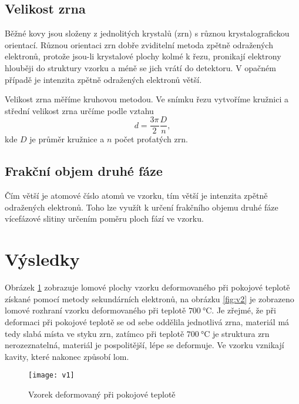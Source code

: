 \documentclass{protokol}
\begin{document}
    \subsection*{Velikost zrna}

      Běžné kovy jsou složeny z jednolitých krystalů (zrn) s různou krystalografickou orientací. Různou orientaci zrn dobře zviditelní metoda zpětně odražených elektronů, protože jsou-li krystalové plochy kolmé k řezu, pronikají elektrony hlouběji do struktury vzorku a méně se jich vrátí do detektoru. V opačném případě je intenzita zpětně odražených elektronů větší.

      Velikost zrna měříme kruhovou metodou. Ve snímku řezu vytvoříme kružnici a střední velikost zrna určíme podle vztahu
      \begin{equation} \label{eq:d}
        d = \frac{3 \pi}{2} \frac{D}{n},
      \end{equation}
      kde $D$ je průměr kružnice a $n$ počet proťatých zrn.

    \subsection*{Frakční objem druhé fáze}

      Čím větší je atomové číslo atomů ve vzorku, tím větší je intenzita zpětně odražených elektronů. Toho lze využít k určení frakčního objemu druhé fáze vícefázové slitiny určením poměru ploch fází ve vzorku.
    
  \section*{Výsledky}

    Obrázek \ref{fig:v1} zobrazuje lomové plochy vzorku deformovaného při pokojové teplotě získané pomocí metody sekundárních elektronů, na obrázku \ref{fig:v2} je zobrazeno lomové rozhraní vzorku deformovaného při teplotě $\SI{700}{\celsius}$. Je zřejmé, že při deformaci při pokojové teplotě se od sebe oddělila jednotlivá zrna, materiál má tedy slabá místa ve styku zrn, zatímco při teplotě $\SI{700}{\celsius}$ je struktura zrn nerozeznatelná, materiál je pospolitější, lépe se deformuje. Ve vzorku vznikají kavity, které nakonec způsobí lom.

    \begin{figure}[H]
      \centering 
      \texttt{[image: v1]}
      \vspace{5pt}
      \caption{Vzorek deformovaný při pokojové teplotě}
      \label{fig:v1}
    \end{figure}
\end{document}

